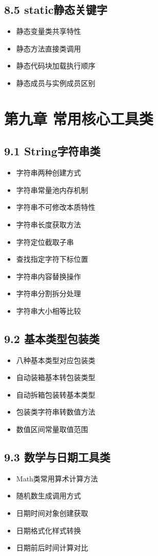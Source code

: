 \subsection{8.5 static静态关键字}
\begin{itemize}
\item 静态变量类共享特性
\item 静态方法直接类调用
\item 静态代码块加载执行顺序
\item 静态成员与实例成员区别
\end{itemize}

\section{第九章 常用核心工具类}
\subsection{9.1 String字符串类}
\begin{itemize}
\item 字符串两种创建方式
\item 字符串常量池内存机制
\item 字符串不可修改本质特性
\item 字符串长度获取方法
\item 字符定位截取子串
\item 查找指定字符下标位置
\item 字符串内容替换操作
\item 字符串分割拆分处理
\item 字符串大小相等比较
\end{itemize}

\subsection{9.2 基本类型包装类}
\begin{itemize}
\item 八种基本类型对应包装类
\item 自动装箱基本转包装类型
\item 自动拆箱包装转基本类型
\item 包装类字符串转数值方法
\item 数值区间常量取值范围
\end{itemize}

\subsection{9.3 数学与日期工具类}
\begin{itemize}
\item Math类常用算术计算方法
\item 随机数生成调用方式
\item 日期时间对象创建获取
\item 日期格式化样式转换
\item 日期前后时间计算对比
\end{itemize}

